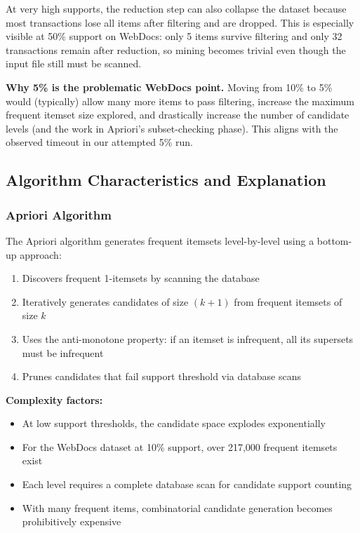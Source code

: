 \documentclass[11pt]{article}
\begin{document}
At very high supports, the reduction step can also collapse the dataset because most transactions lose all items after filtering and are dropped. This is especially visible at 50\% support on WebDocs: only 5 items survive filtering and only 32 transactions remain after reduction, so mining becomes trivial even though the input file still must be scanned.

\noindent\textbf{Why 5\% is the problematic WebDocs point.} Moving from 10\% to 5\% would (typically) allow many more items to pass filtering, increase the maximum frequent itemset size explored, and drastically increase the number of candidate levels (and the work in Apriori's subset-checking phase). This aligns with the observed timeout in our attempted 5\% run.

\subsection{Algorithm Characteristics and Explanation}

\subsubsection{Apriori Algorithm}

The Apriori algorithm generates frequent itemsets level-by-level using a bottom-up approach:

\begin{enumerate}
    \item Discovers frequent 1-itemsets by scanning the database
    \item Iteratively generates candidates of size $(k+1)$ from frequent itemsets of size $k$
    \item Uses the anti-monotone property: if an itemset is infrequent, all its supersets must be infrequent
    \item Prunes candidates that fail support threshold via database scans
\end{enumerate}

\textbf{Complexity factors:}
\begin{itemize}
    \item At low support thresholds, the candidate space explodes exponentially
    \item For the WebDocs dataset at 10\% support, over 217,000 frequent itemsets exist
    \item Each level requires a complete database scan for candidate support counting
    \item With many frequent items, combinatorial candidate generation becomes prohibitively expensive
\end{itemize}
\end{document}
